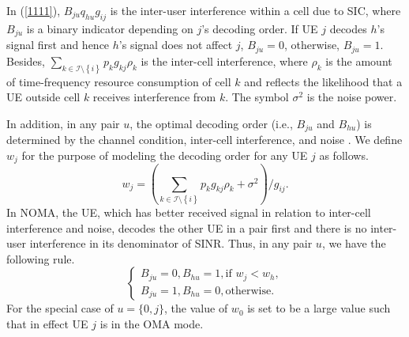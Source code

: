 \documentclass[10pt,journal,final,finalsubmission,twocolumn]{IEEEtran}
\begin{document}
In (\ref{1111}), $B_{ju}q_{hu}g_{ij}$ is the inter-user interference within a cell due to SIC, where $B_{ju}$ is a binary indicator depending on $j$'s decoding order. If UE $j$ decodes $h$'s signal first and hence $h$'s signal does not affect $j$, $B_{ju} = 0$, otherwise, $B_{ju} = 1$. Besides, ${\sum_{k\in \mathcal{I}\setminus \left \{ i \right \}}p_kg_{kj}\rho_k}$ is the inter-cell interference, where $\rho_k$ is the amount of time-frequency resource consumption of cell $k$ and reflects the likelihood that a UE outside cell $k$ receives interference from $k$. The symbol $\sigma^2$ is the noise power.

In addition, in any pair $u$, the optimal decoding order (i.e., $B_{ju}$ and $B_{hu}$) is determined by the channel condition, inter-cell interference, and noise \cite{41}. We define $w_j$ for the purpose of modeling the decoding order for any UE $j$ as follows. 
\begin{equation}
w_j=  \left(\sum \limits_{k \in \mathcal{I}\setminus \left \{ i \right \} }p_k g_{kj}\rho_k+\sigma ^2   \right) / g_{ij} .
\end{equation}
In NOMA, the UE, which has better received signal in relation to inter-cell interference and noise, decodes the other UE in a pair first and there is no inter-user interference in its denominator of SINR. Thus, in any pair $u$, we have the following rule. 
\begin{equation}\label{rule}
\left\{\begin{array}{l}
B_{ju} = 0,B_{hu} =1, \text{if } w_j < w_h,\\
B_{ju} = 1,B_{hu} =0, \text{otherwise}.
\end{array}\right.
\end{equation}
For the special case of $u = \{0, j\}$, the value of $w_0$ is set to be a large value such that in effect UE $j$ is in the OMA mode.
\end{document}
